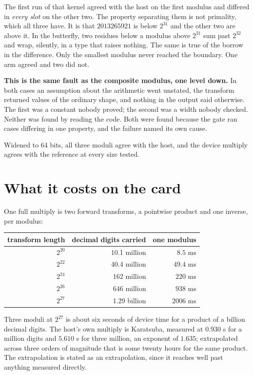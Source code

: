 \documentclass{article}
\begin{document}
The first run of that kernel agreed with the host on the first modulus and differed in \emph{every slot} on the other two. The property separating them is not primality, which all three have. It is that \(2013265921\) is below \(2^{31}\) and the other two are above it. In the butterfly, two residues below a modulus above \(2^{31}\) sum past \(2^{32}\) and wrap, silently, in a type that raises nothing. The same is true of the borrow in the difference. Only the smallest modulus never reached the boundary. One arm agreed and two did not.

\textbf{This is the same fault as the composite modulus, one level down.} In both cases an assumption about the arithmetic went unstated, the transform returned values of the ordinary shape, and nothing in the output said otherwise. The first was a constant nobody proved; the second was a width nobody checked. Neither was found by reading the code. Both were found because the gate ran cases differing in one property, and the failure named its own cause.

Widened to 64 bits, all three moduli agree with the host, and the device multiply agrees with the reference at every size tested.

\section{What it costs on the card}

One full multiply is two forward transforms, a pointwise product and one inverse, per modulus:

\begin{center}
\begin{tabular}{@{}rrr@{}}
\toprule
transform length & decimal digits carried & one modulus \\
\midrule
\(2^{20}\) & 10.1 million & \(8.5\) ms \\
\(2^{22}\) & 40.4 million & \(49.4\) ms \\
\(2^{24}\) & 162 million & \(220\) ms \\
\(2^{26}\) & 646 million & \(938\) ms \\
\(2^{27}\) & 1.29 billion & \(2006\) ms \\
\bottomrule
\end{tabular}
\end{center}

Three moduli at \(2^{27}\) is about six seconds of device time for a product of a billion decimal digits. The host's own multiply is Karatsuba, measured at \(0.930\) s for a million digits and \(5.610\) s for three million, an exponent of \(1.635\); extrapolated across three orders of magnitude that is some twenty hours for the same product. The extrapolation is stated as an extrapolation, since it reaches well past anything measured directly.
\end{document}
